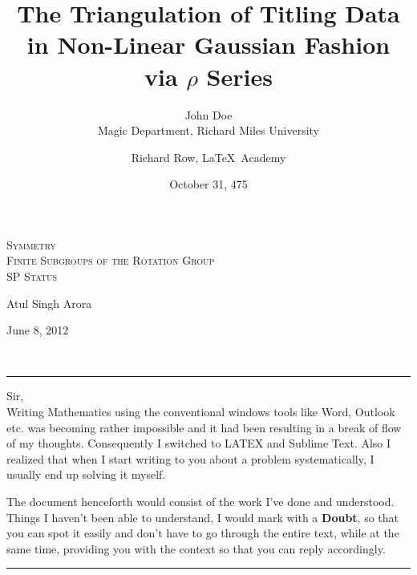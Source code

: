 \documentclass[12pt]{article}
\title{The Triangulation of Titling Data in
       Non-Linear Gaussian Fashion via $\rho$ Series}
\date{October 31, 475}
\author{John Doe\\ Magic Department, Richard Miles University
        \and Richard Row, \LaTeX\ Academy}
\begin{document}



\begin{center}
\textsc{{\huge Symmetry\\}
Finite Subgroups of the Rotation Group\\
\small SP Status\\}
\begin{minipage}{0.4\textwidth}
\begin{flushleft} Atul Singh Arora \end{flushleft}
\end{minipage}
\begin{minipage}{0.4\textwidth}
\begin{flushright} {\small June 8, 2012} \end{flushright}
\end{minipage}
\\
\end{center}
\hrule

\vspace{12pt}

Sir,\\
Writing Mathematics using the conventional windows tools like Word, Outlook etc. was becoming rather impossible and it had been resulting in a break of flow of my thoughts. Consequently I switched to LATEX and Sublime Text. Also I realized that when I start writing to you about a problem systematically, I usually end up solving it myself.\\
\par
The document henceforth would consist of the work I've done and understood. Things I haven't been able to understand, I would mark with a {\bf Doubt}, so that you can spot it easily and don't have to go through the entire text, while at the same time, providing you with the context so that you can reply accordingly.\\
\hrule
\vspace{12pt}
\end{document}

